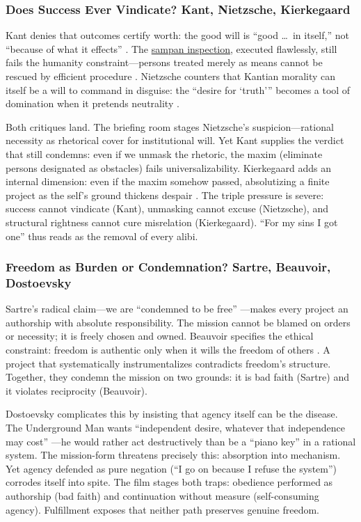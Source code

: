 \subsubsection*{Does Success Ever Vindicate? Kant, Nietzsche, Kierkegaard}

Kant denies that outcomes certify worth: the good will is ``good \ldots\ in itself,'' not
``because of what it effects'' \parencite[p.~27]{KantGroundwork1996}. The
\hyperref[scene:sampan]{sampan inspection}, executed flawlessly, still fails the humanity
constraint---persons treated merely as means cannot be rescued by efficient procedure
\parencite[pp.~36--37]{KantCPrR1996}. Nietzsche
counters that Kantian morality can itself be a will to command in disguise: the ``desire for
`truth''' becomes a tool of domination when it pretends neutrality
\parencite[\S 34]{NietzscheBGE1990}.

Both critiques land. The briefing room stages Nietzsche's suspicion---rational necessity as
rhetorical cover for institutional will. Yet Kant supplies the verdict that still condemns:
even if we unmask the rhetoric, the maxim (eliminate persons designated as obstacles) fails
universalizability. Kierkegaard adds an internal dimension: even if the maxim somehow passed,
absolutizing a finite project as the self's ground thickens despair
\parencite[pp.~69--83]{KierkegaardSUD1980}. The triple pressure is severe: success cannot
vindicate (Kant), unmasking cannot excuse (Nietzsche), and structural rightness cannot cure
misrelation (Kierkegaard). ``For my sins I got one'' thus reads as the removal of every alibi.

\subsubsection*{Freedom as Burden or Condemnation? Sartre, Beauvoir, Dostoevsky}

Sartre's radical claim---we are ``condemned to be free''
\parencite[pp.~34--36]{SartreBN2003}---makes every project an authorship with absolute
responsibility. The mission cannot be blamed on
orders or necessity; it is freely chosen and owned. Beauvoir specifies the ethical constraint:
freedom is authentic only when it wills the freedom of others \parencite[p.~73]{Beauvoir1976}.
A project that systematically instrumentalizes contradicts freedom's structure. Together, they
condemn the mission on two grounds: it is bad faith (Sartre) and it violates reciprocity
(Beauvoir).

Dostoevsky complicates this by insisting that agency itself can be the disease. The
Underground Man wants ``independent desire, whatever that independence may cost''
\parencite[p.~131]{DostoevskyNFU1994}---he would rather act destructively than be a ``piano
key'' in a rational system. The mission-form threatens precisely this: absorption into
mechanism. Yet agency defended as pure negation (``I go on because I refuse the system'')
corrodes itself into spite. The film stages both traps: obedience performed as authorship
(bad faith) and continuation without measure (self-consuming agency). Fulfillment exposes that
neither path preserves genuine freedom.

